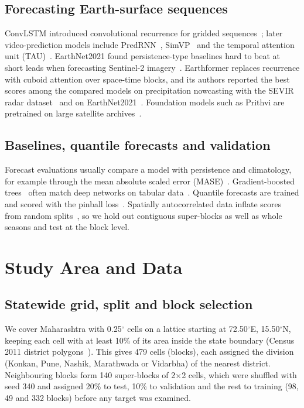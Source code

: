 \documentclass[journal]{IEEEtran}
\begin{document}
\subsection{Forecasting Earth-surface sequences}
ConvLSTM introduced convolutional recurrence for gridded sequences~\cite{convlstm}; later video-prediction models include PredRNN~\cite{predrnn}, SimVP~\cite{simvp} and the temporal attention unit (TAU)~\cite{tau}. EarthNet2021 found persistence-type baselines hard to beat at short leads when forecasting Sentinel-2 imagery~\cite{earthnet}. Earthformer replaces recurrence with cuboid attention over space-time blocks, and its authors reported the best scores among the compared models on precipitation nowcasting with the SEVIR radar dataset~\cite{sevir} and on EarthNet2021~\cite{earthformer}. Foundation models such as Prithvi are pretrained on large satellite archives~\cite{prithvi}.

\subsection{Baselines, quantile forecasts and validation}
Forecast evaluations usually compare a model with persistence and climatology, for example through the mean absolute scaled error (MASE)~\cite{hyndman}. Gradient-boosted trees~\cite{lightgbm} often match deep networks on tabular data~\cite{grinsztajn}. Quantile forecasts are trained and scored with the pinball loss~\cite{quantile}. Spatially autocorrelated data inflate scores from random splits~\cite{roberts}, so we hold out contiguous super-blocks as well as whole seasons and test at the block level.

\section{Study Area and Data}
\subsection{Statewide grid, split and block selection}
We cover Maharashtra with 0.25$^\circ$ cells on a lattice starting at 72.50$^\circ$E, 15.50$^\circ$N, keeping each cell with at least 10\% of its area inside the state boundary (Census 2011 district polygons~\cite{indiamaps}). This gives 479 cells (blocks), each assigned the division (Konkan, Pune, Nashik, Marathwada or Vidarbha) of the nearest district. Neighbouring blocks form 140 super-blocks of 2$\times$2 cells, which were shuffled with seed 340 and assigned 20\% to test, 10\% to validation and the rest to training (98, 49 and 332 blocks) before any target was examined.
\end{document}
